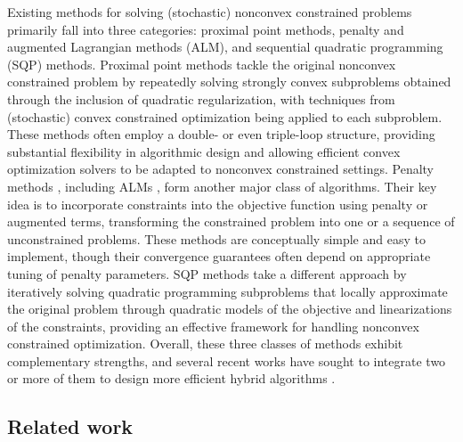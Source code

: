 \documentclass[11pt]{article}
\begin{document}
Existing methods for solving {(stochastic) nonconvex constrained} problems primarily fall into three categories: proximal point methods, penalty and augmented Lagrangian methods (ALM), and sequential quadratic programming (SQP) methods. 
{Proximal point methods \cite{ma2020quadratically,boob2023stochastic,boob2025level,jia2025first} tackle the original nonconvex constrained problem by repeatedly solving strongly convex subproblems obtained through the inclusion of quadratic regularization, with  techniques from (stochastic) convex constrained optimization being applied to each subproblem.}
{These methods often employ a double- or even triple-loop structure, providing substantial flexibility in algorithmic design and allowing efficient convex optimization solvers to be adapted to nonconvex constrained settings.}
Penalty methods \cite{alacaoglu2024complexity,cartis2017corrigendum,lin2022complexity,shi2020penalty,wang2017penalty}, including ALMs \cite{jin2022stochastic,li2021rate,sahin2019inexact,shi2025momentum}, {form another major class of algorithms.}  
{Their key idea is to incorporate constraints into the objective function using penalty or augmented terms, transforming the constrained problem into one or a sequence of unconstrained problems.} 
{These methods are conceptually simple and easy to implement, though their convergence guarantees often depend on appropriate tuning of penalty parameters.} 
{SQP methods \cite{berahas2021sequential,curtis2024worst,curtis2024sequential,qiu2023sequential,shen2025sequential} take a different approach by iteratively solving quadratic programming subproblems that locally approximate the original problem through quadratic models of the objective and linearizations of the constraints, providing an effective framework for handling nonconvex constrained optimization.} 
{Overall, these three classes of methods exhibit complementary strengths, and several recent works have sought to integrate two or more of them to design more efficient hybrid algorithms \cite{na2023adaptive,na2023inequality}.}

\subsection{Related work}
\end{document}

